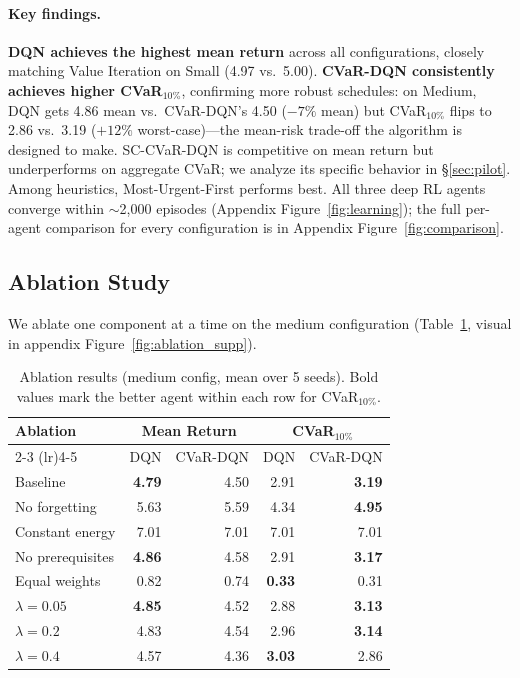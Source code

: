 \documentclass[a4paper,11pt]{article}
\theoremstyle{definition}
\begin{document}
\paragraph{Key findings.} \textbf{DQN achieves the highest mean return} across all configurations, closely matching Value Iteration on Small (4.97 vs.\ 5.00). \textbf{CVaR-DQN consistently achieves higher CVaR$_{10\%}$}, confirming more robust schedules: on Medium, DQN gets 4.86 mean vs.\ CVaR-DQN's 4.50 ($-7\%$ mean) but CVaR$_{10\%}$ flips to 2.86 vs.\ 3.19 ($+12\%$ worst-case)---the mean-risk trade-off the algorithm is designed to make. SC-CVaR-DQN is competitive on mean return but underperforms on aggregate CVaR; we analyze its specific behavior in \S\ref{sec:pilot}. Among heuristics, Most-Urgent-First performs best. All three deep RL agents converge within $\sim$2{,}000 episodes (Appendix Figure~\ref{fig:learning}); the full per-agent comparison for every configuration is in Appendix Figure~\ref{fig:comparison}.

\subsection{Ablation Study}

We ablate one component at a time on the medium configuration (Table~\ref{tab:ablation}, visual in appendix Figure~\ref{fig:ablation_supp}).

\begin{table}[H]
\centering
\caption{Ablation results (medium config, mean over 5 seeds). Bold values mark the better agent within each row for CVaR$_{10\%}$.}
\label{tab:ablation}
\begin{tabular}{lrrrr}
\toprule
Ablation & \multicolumn{2}{c}{Mean Return} & \multicolumn{2}{c}{CVaR$_{10\%}$} \\
\cmidrule(lr){2-3} \cmidrule(lr){4-5}
         & DQN & CVaR-DQN & DQN & CVaR-DQN \\
\midrule
Baseline          & \textbf{4.79} & 4.50 & 2.91 & \textbf{3.19} \\
No forgetting     & 5.63 & 5.59 & 4.34 & \textbf{4.95} \\
Constant energy   & 7.01 & 7.01 & 7.01 & 7.01 \\
No prerequisites  & \textbf{4.86} & 4.58 & 2.91 & \textbf{3.17} \\
Equal weights     & 0.82 & 0.74 & \textbf{0.33} & 0.31 \\
$\lambda = 0.05$  & \textbf{4.85} & 4.52 & 2.88 & \textbf{3.13} \\
$\lambda = 0.2$   & 4.83 & 4.54 & 2.96 & \textbf{3.14} \\
$\lambda = 0.4$   & 4.57 & 4.36 & \textbf{3.03} & 2.86 \\
\bottomrule
\end{tabular}
\end{table}
\end{document}
